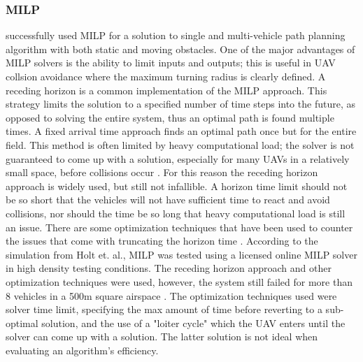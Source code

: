 \documentclass[10pt, conference, compsocconf]{IEEEtran}
\begin{document}
\subsubsection{MILP}
\cite{schouwenaars2001mixed} successfully used MILP for a solution to single and multi-vehicle path planning algorithm with both static and moving obstacles.  One of the major advantages of MILP solvers is the ability to limit inputs and outputs; this is useful in UAV collsion avoidance where the maximum turning radius is clearly defined.  A receding horizon is a common implementation of the MILP approach. This strategy limits the solution to a specified number of time steps into the future, as opposed to solving the entire system, thus an optimal path is found multiple times. A fixed arrival time approach finds an optimal path once but for the entire field. This method is often limited by heavy computational load; the solver is not guaranteed to come up with a solution, especially for many UAVs in a relatively small space, before collisions occur \cite{schouwenaars2001mixed}.  For this reason the receding horizon approach is widely used, but still not infallible.  A horizon time limit should not be so short that the vehicles will not have sufficient time to react and avoid collisions, nor should the time be so long that heavy computational load is still an issue. There are some optimization techniques that have been used to counter the issues that come with truncating the horizon time \cite{mettler2008receding}.  According to the simulation from Holt et. al., MILP was tested using a licensed online MILP solver in high density testing conditions. The receding horizon approach and other optimization techniques were used, however, the system still failed for more than 8 vehicles in a 500m square airspace \cite{lastyearMILP}.  The optimization techniques used were solver time limit, specifying the max amount of time before reverting to a sub-optimal solution, and the use of a "loiter cycle" which the UAV enters until the solver can come up with a solution.  The latter solution is not ideal when evaluating an algorithm's efficiency.
\end{document}
